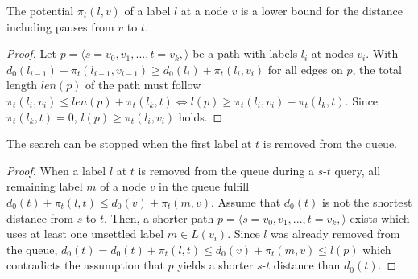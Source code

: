 \begin{lemma}
	The potential $\pi_t(l,v)$ of a label $l$ at a node $v$ is a lower bound for the distance including pauses from $v$ to $t$.
\end{lemma}

\begin{proof}
	Let $p = \langle s=v_0,v_1,...,t=v_k, \rangle$ be a path with labels $l_i$ at nodes $v_i$. With $d_0(l_{i-1}) + \pi_t(l_{i-1},v_{i-1}) \ge d_0(l_{i}) + \pi_t(l_i,v_i)$ for all edges on $p$, the total length $len(p)$ of the path must follow $\pi_t(l_i,v_i) \le len(p) + \pi_t(l_k,t) \Leftrightarrow l(p) \ge \pi_t(l_i,v_i) - \pi_t(l_k,t)$. Since $\pi_t(l_k,t) = 0$, $l(p) \ge \pi_t(l_i,v_i)$ holds.
\end{proof}

\begin{theorem}
	The search can be stopped when the first label at $t$ is removed from the queue.
\end{theorem}

\begin{proof}
	When a label $l$ at $t$ is removed from the queue during a $s$-$t$ query, all remaining label $m$ of a node $v$ in the queue fulfill $d_0(t) + \pi_t(l,t) \le d_0(v) + \pi_t(m,v)$. Assume that $d_0(t)$ is not the shortest distance from $s$ to $t$. Then, a shorter path $p = \langle s=v_0,v_1,...,t=v_k, \rangle$ exists which uses at least one unsettled label $m \in L(v_i)$. Since $l$ was already removed from the queue, $d_0(t) = d_0(t) + \pi_t(l,t) \le  d_0(v) + \pi_t(m,v) \le l(p)$ which contradicts the assumption that $p$ yields a shorter $s$-$t$ distance than $d_0(t)$.
\end{proof}


